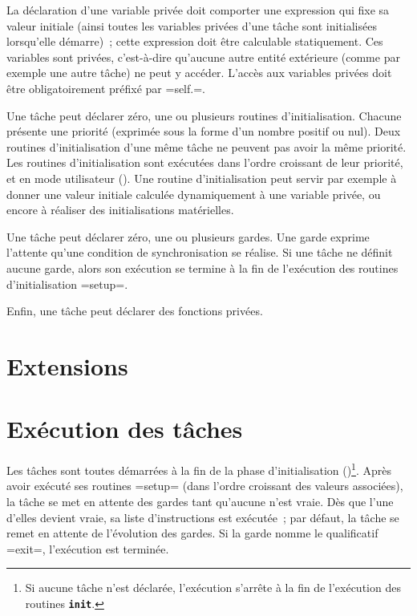 La déclaration d'une variable privée doit comporter une expression qui fixe sa valeur initiale (ainsi toutes les variables privées d'une tâche sont initialisées lorsqu'elle démarre)~; cette expression doit être calculable statiquement. Ces variables sont privées, c'est-à-dire qu'aucune autre entité extérieure (comme par exemple une autre tâche) ne peut y accéder. L'accès aux variables privées doit être obligatoirement préfixé par \omnibus=self.=.

Une tâche peut déclarer zéro, une ou plusieurs routines d'initialisation. Chacune présente une priorité (exprimée sous la forme d'un nombre positif ou nul). Deux routines d'initialisation d'une même tâche ne peuvent pas avoir la même priorité. Les routines d'initialisation sont exécutées dans l'ordre croissant de leur priorité, et en mode utilisateur (). Une routine d'initialisation peut servir par exemple à donner une valeur initiale calculée dynamiquement à une variable privée, ou encore à réaliser des initialisations matérielles.

Une tâche peut déclarer zéro, une ou plusieurs gardes. Une garde exprime l'attente qu'une condition de synchronisation se réalise. Si une tâche ne définit aucune garde, alors son exécution se termine à la fin de l'exécution des routines d'initialisation \omnibus=setup=.

Enfin, une tâche peut déclarer des fonctions privées.






\section{Extensions}






\section{Exécution des tâches}

Les tâches sont toutes démarrées à la fin de la phase d'initialisation ()\footnote{Si aucune tâche n'est déclarée, l'exécution s'arrête à la fin de l'exécution des routines \texttt{\bf init}.}. Après avoir exécuté ses routines \omnibus=setup= (dans l'ordre croissant des valeurs associées), la tâche se met en attente des gardes tant qu'aucune n'est vraie. Dès que l'une d'elles devient vraie, sa liste d'instructions est exécutée~; par défaut, la tâche se remet en attente de l'évolution des gardes. Si la garde nomme le qualificatif \omnibus=exit=, l'exécution est terminée.

